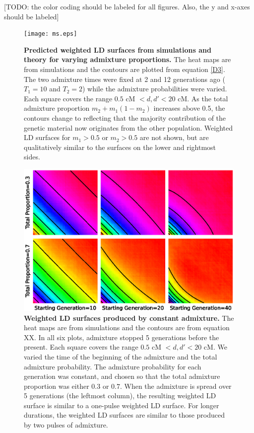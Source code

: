 [TODO: the color coding should be labeled for all figures.  Also, the y and x-axes should be labeled]

\begin{figure}
\texttt{[image: ms.eps]}
\caption{
{\bf Predicted weighted LD surfaces from simulations and theory for varying admixture proportions.} The heat maps are from simulations and the contours are plotted from equation \ref{D3}. The two admixture times were fixed at 2 and 12 generations ago ($T_1=10$ and $T_2=2$) while the admixture probabilities were varied. Each square covers the range $0.5 \text{ cM }<d,d'<20\text{ cM}$. As the total admixture proportion $m_2+m_1(1-m_2)$ increases above 0.5, the contours change to reflecting that the majority contribution of the genetic material now originates from the other population. Weighted LD surfaces for $m_1>0.5$ or $m_2>0.5$ are not shown, but are qualitatively similar to the surfaces on the lower and rightmost sides.
}
\label{ms}
\end{figure}

\begin{figure}
\includegraphics[scale=.8]{continuous.eps}
\caption{
{\bf Weighted LD surfaces produced by constant admixture.} The heat maps are from simulations and the contours are from equation XX. In all six plots, admixture stopped 5 generations before the present. Each square covers the range $0.5 \text{ cM }<d,d'<20\text{ cM}$. We varied the time of the beginning of the admixture and the total admixture probability. The admixture probability for each generation was constant, and chosen so that the total admixture proportion was either $0.3$ or $0.7$. When the admixture is spread over 5 generations (the leftmost column), the resulting weighted LD surface is similar to a one-pulse weighted LD surface. For longer durations, the weighted LD surfaces are similar to those produced by two pulses of admixture.
}
\label{continuous}
\end{figure}

